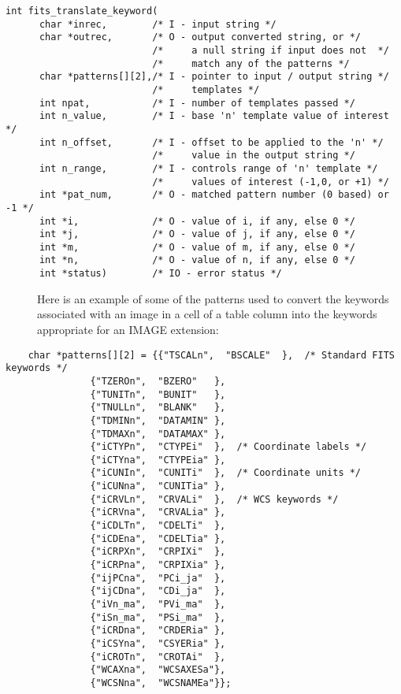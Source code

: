 \documentclass[11pt]{book}
\begin{document}
\begin{verbatim}
int fits_translate_keyword(
      char *inrec,        /* I - input string */
      char *outrec,       /* O - output converted string, or */
                          /*     a null string if input does not  */
                          /*     match any of the patterns */
      char *patterns[][2],/* I - pointer to input / output string */
                          /*     templates */
      int npat,           /* I - number of templates passed */
      int n_value,        /* I - base 'n' template value of interest */
      int n_offset,       /* I - offset to be applied to the 'n' */
                          /*     value in the output string */
      int n_range,        /* I - controls range of 'n' template */
                          /*     values of interest (-1,0, or +1) */
      int *pat_num,       /* O - matched pattern number (0 based) or -1 */
      int *i,             /* O - value of i, if any, else 0 */
      int *j,             /* O - value of j, if any, else 0 */
      int *m,             /* O - value of m, if any, else 0 */
      int *n,             /* O - value of n, if any, else 0 */
      int *status)        /* IO - error status */
\end{verbatim}

\begin{description}
\item[  ]  Here is an example of some of the patterns used to convert the keywords associated
with an image in a cell of a table column into the keywords appropriate for
an IMAGE extension:
\end{description}

\begin{verbatim}
    char *patterns[][2] = {{"TSCALn",  "BSCALE"  },  /* Standard FITS keywords */
			   {"TZEROn",  "BZERO"   },
			   {"TUNITn",  "BUNIT"   },
			   {"TNULLn",  "BLANK"   },
			   {"TDMINn",  "DATAMIN" },
			   {"TDMAXn",  "DATAMAX" },
			   {"iCTYPn",  "CTYPEi"  },  /* Coordinate labels */
			   {"iCTYna",  "CTYPEia" },
			   {"iCUNIn",  "CUNITi"  },  /* Coordinate units */
			   {"iCUNna",  "CUNITia" },
			   {"iCRVLn",  "CRVALi"  },  /* WCS keywords */
			   {"iCRVna",  "CRVALia" },
			   {"iCDLTn",  "CDELTi"  },
			   {"iCDEna",  "CDELTia" },
			   {"iCRPXn",  "CRPIXi"  },
			   {"iCRPna",  "CRPIXia" },
			   {"ijPCna",  "PCi_ja"  },
			   {"ijCDna",  "CDi_ja"  },
			   {"iVn_ma",  "PVi_ma"  },
			   {"iSn_ma",  "PSi_ma"  },
			   {"iCRDna",  "CRDERia" },
			   {"iCSYna",  "CSYERia" },
			   {"iCROTn",  "CROTAi"  },
			   {"WCAXna",  "WCSAXESa"},
			   {"WCSNna",  "WCSNAMEa"}};
\end{verbatim}
\end{document}
